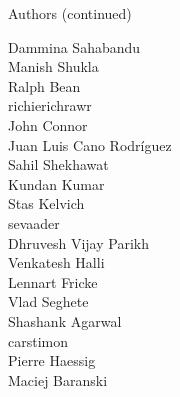 \begin{frame}{Authors (continued)}
\begin{multicols}{5}
Dammina Sahabandu\\
Manish Shukla\\
Ralph Bean\\
richierichrawr\\
John Connor\\
Juan Luis Cano Rodríguez\\
Sahil Shekhawat\\
Kundan Kumar\\
Stas Kelvich\\
sevaader\\
Dhruvesh Vijay Parikh\\
Venkatesh Halli\\
Lennart Fricke\\
Vlad Seghete\\
Shashank Agarwal\\
carstimon\\
Pierre Haessig\\
Maciej Baranski\\
\end{multicols}
\end{frame}
